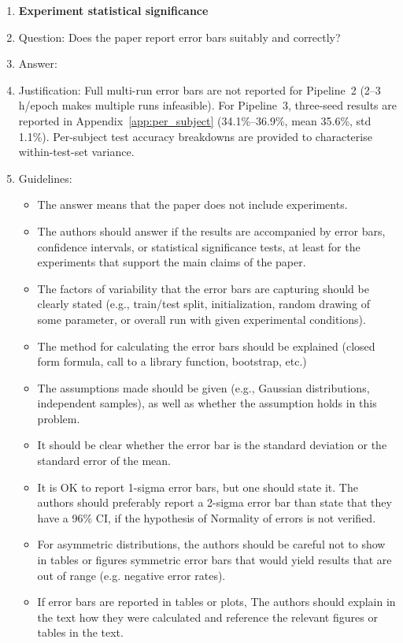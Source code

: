 \documentclass{article}
\begin{document}
\begin{enumerate}
\item {\bf Experiment statistical significance}
    \item[] Question: Does the paper report error bars suitably and correctly?
    \item[] Answer: \answerNo{}
    \item[] Justification: Full multi-run error bars are not reported for Pipeline~2 (2--3\,h/epoch makes multiple runs infeasible). For Pipeline~3, three-seed results are reported in Appendix~\ref{app:per_subject} (34.1\%--36.9\%, mean 35.6\%, std 1.1\%). Per-subject test accuracy breakdowns are provided to characterise within-test-set variance.
    \item[] Guidelines:
    \begin{itemize}
        \item The answer \answerNA{} means that the paper does not include experiments.
        \item The authors should answer \answerYes{} if the results are accompanied by error bars, confidence intervals, or statistical significance tests, at least for the experiments that support the main claims of the paper.
        \item The factors of variability that the error bars are capturing should be clearly stated (e.g., train/test split, initialization, random drawing of some parameter, or overall run with given experimental conditions).
        \item The method for calculating the error bars should be explained (closed form formula, call to a library function, bootstrap, etc.)
        \item The assumptions made should be given (e.g., Gaussian distributions, independent samples), as well as whether the assumption holds in this problem.
        \item It should be clear whether the error bar is the standard deviation or the standard error of the mean.
        \item It is OK to report 1-sigma error bars, but one should state it. The authors should preferably report a 2-sigma error bar than state that they have a 96\% CI, if the hypothesis of Normality of errors is not verified.
        \item For asymmetric distributions, the authors should be careful not to show in tables or figures symmetric error bars that would yield results that are out of range (e.g. negative error rates).
        \item If error bars are reported in tables or plots, The authors should explain in the text how they were calculated and reference the relevant figures or tables in the text.
    \end{itemize}


\end{enumerate}
\end{document}
